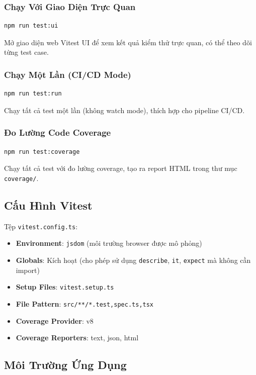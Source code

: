 \documentclass[12pt,a4paper,vietnamese]{article}
\begin{document}
\subsubsection{Chạy Với Giao Diện Trực Quan}
\begin{verbatim}
npm run test:ui
\end{verbatim}
Mở giao diện web Vitest UI để xem kết quả kiểm thử trực quan, có thể theo dõi từng test case.

\subsubsection{Chạy Một Lần (CI/CD Mode)}
\begin{verbatim}
npm run test:run
\end{verbatim}
Chạy tất cả test một lần (không watch mode), thích hợp cho pipeline CI/CD.

\subsubsection{Đo Lường Code Coverage}
\begin{verbatim}
npm run test:coverage
\end{verbatim}
Chạy tất cả test với đo lường coverage, tạo ra report HTML trong thư mục \texttt{coverage/}.

\subsection{Cấu Hình Vitest}

Tệp \texttt{vitest.config.ts}:
\begin{itemize}
    \item \textbf{Environment}: \texttt{jsdom} (môi trường browser được mô phỏng)
    \item \textbf{Globals}: Kích hoạt (cho phép sử dụng \texttt{describe}, \texttt{it}, \texttt{expect} mà không cần import)
    \item \textbf{Setup Files}: \texttt{vitest.setup.ts}
    \item \textbf{File Pattern}: \texttt{src/**/*.{test,spec}.{ts,tsx}}
    \item \textbf{Coverage Provider}: v8
    \item \textbf{Coverage Reporters}: text, json, html
\end{itemize}

\subsection{Môi Trường Ứng Dụng}
\end{document}
